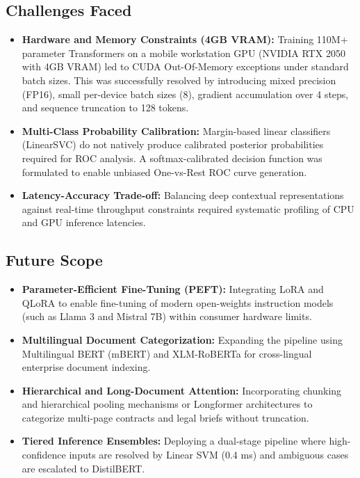 \documentclass[12pt, a4paper]{article}
\begin{document}
\subsection{Challenges Faced}
\begin{itemize}
    \item \textbf{Hardware and Memory Constraints (4GB VRAM):} Training 110M+ parameter Transformers on a mobile workstation GPU (NVIDIA RTX 2050 with 4GB VRAM) led to CUDA Out-Of-Memory exceptions under standard batch sizes. This was successfully resolved by introducing mixed precision (FP16), small per-device batch sizes (8), gradient accumulation over 4 steps, and sequence truncation to 128 tokens.
    \item \textbf{Multi-Class Probability Calibration:} Margin-based linear classifiers (LinearSVC) do not natively produce calibrated posterior probabilities required for ROC analysis. A softmax-calibrated decision function was formulated to enable unbiased One-vs-Rest ROC curve generation.
    \item \textbf{Latency-Accuracy Trade-off:} Balancing deep contextual representations against real-time throughput constraints required systematic profiling of CPU and GPU inference latencies.
\end{itemize}

\subsection{Future Scope}
\begin{itemize}
    \item \textbf{Parameter-Efficient Fine-Tuning (PEFT):} Integrating LoRA and QLoRA to enable fine-tuning of modern open-weights instruction models (such as Llama 3 and Mistral 7B) within consumer hardware limits.
    \item \textbf{Multilingual Document Categorization:} Expanding the pipeline using Multilingual BERT (mBERT) and XLM-RoBERTa for cross-lingual enterprise document indexing.
    \item \textbf{Hierarchical and Long-Document Attention:} Incorporating chunking and hierarchical pooling mechanisms or Longformer architectures to categorize multi-page contracts and legal briefs without truncation.
    \item \textbf{Tiered Inference Ensembles:} Deploying a dual-stage pipeline where high-confidence inputs are resolved by Linear SVM (0.4 ms) and ambiguous cases are escalated to DistilBERT.
\end{itemize}
\end{document}
